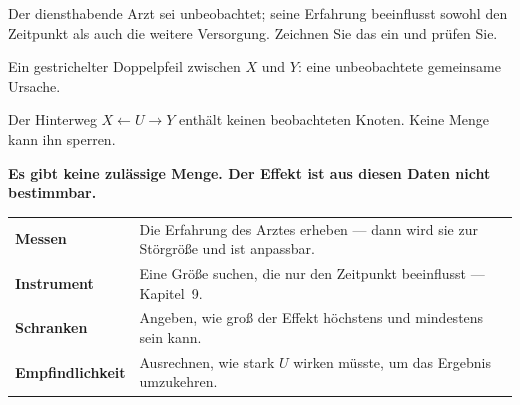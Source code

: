 \begin{aufgabe}
Der diensthabende Arzt sei unbeobachtet; seine Erfahrung beeinflusst sowohl den Zeitpunkt als auch die weitere Versorgung. Zeichnen Sie das ein und prüfen Sie.

\loesung
{}
Ein gestrichelter Doppelpfeil zwischen $X$ und $Y$: eine unbeobachtete gemeinsame Ursache.

Der Hinterweg $X \leftarrow U \to Y$ enthält keinen beobachteten Knoten. Keine Menge kann ihn sperren.

\begin{center}
\begin{minipage}{0.9\textwidth}
\textbf{Es gibt keine zulässige Menge. Der Effekt ist aus diesen Daten nicht bestimmbar.}
\end{minipage}
\end{center}

\begin{center}
{\small
\renewcommand{\arraystretch}{1.5}
\begin{tabular}{@{}P{2.6cm}P{6.0cm}@{}}
\toprule
\textbf{Messen} & Die Erfahrung des Arztes erheben --- dann wird sie zur Störgröße und ist anpassbar.\\
\textbf{Instrument} & Eine Größe suchen, die nur den Zeitpunkt beeinflusst --- Kapitel~9.\\
\textbf{Schranken} & Angeben, wie groß der Effekt höchstens und mindestens sein kann.\\
\textbf{Empfindlichkeit} & Ausrechnen, wie stark $U$ wirken müsste, um das Ergebnis umzukehren.\\
\bottomrule
\end{tabular}}
\end{center}

\begin{center}
\begin{minipage}{0.88\textwidth}
\end{minipage}
\end{center}
\end{aufgabe}

